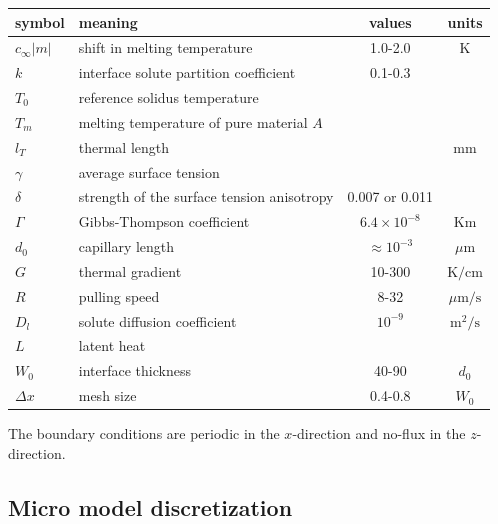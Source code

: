 \documentclass[a4paper,12pt]{article}
\begin{document}
\begin{table}
\centering
\begin{tabular}{l l c c }
\toprule
symbol & meaning & values & units \\
\midrule
$c_{\infty}|m|$ & shift in melting temperature &  1.0-2.0 & K \\
$k$ & interface solute partition coefficient & 0.1-0.3 &\\
$T_0$ & reference solidus temperature &  &\\
$T_m$ & melting temperature of pure material $A$ &  &\\
$l_T$ & thermal length &  & mm \\
$\gamma$ &  average surface tension &  & \\
$\delta$ & strength of the surface tension anisotropy  &  0.007 or 0.011 &\\
$\Gamma$ & Gibbs-Thompson coefficient & $6.4\times 10^{-8}$ & Km \\
$d_0$ & capillary length & $\approx 10^{-3}$  & $\mu$m \\
$G$ & thermal gradient & 10-300 & $\text{K} / \text{cm}$ \\
$R$ & pulling speed &  8-32 & $\mu \text{m} / \text{s}$ \\
$D_l$ & solute diffusion coefficient &$10^{-9}$ &  $\text{m}^2/\text{s}$ \\
$L$ & latent heat &  & \\
$W_0$ & interface thickness  & 40-90  & $d_0$ \\
$\Delta x$ & mesh size & 0.4-0.8 & $W_0$ \\
\bottomrule
\end{tabular}
\end{table}


The boundary conditions are periodic in the $x$-direction and no-flux in the $z$-direction.


\subsection{Micro model discretization}
\end{document}
